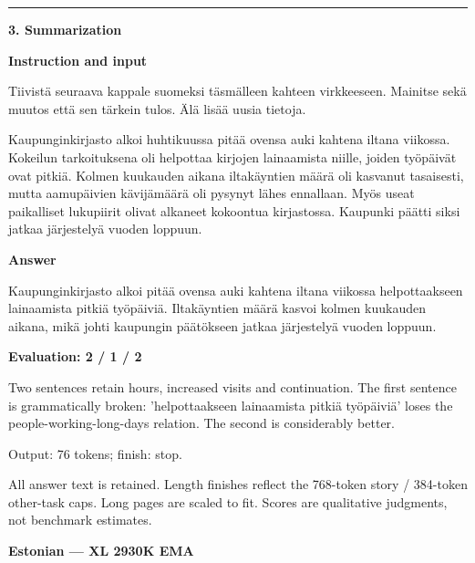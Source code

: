 \documentclass[10pt]{article}
\begin{document}
{\begin{minipage}{\textwidth}
\medskip\hrule\smallskip
{\bfseries 3. Summarization}\par\smallskip
\textbf{Instruction and input}\par Tiivistä seuraava kappale suomeksi täsmälleen kahteen virkkeeseen. Mainitse sekä muutos että sen tärkein tulos. Älä lisää uusia tietoja.
\par\smallskip
Kaupunginkirjasto alkoi huhtikuussa pitää ovensa auki kahtena iltana viikossa. Kokeilun tarkoituksena oli helpottaa kirjojen lainaamista niille, joiden työpäivät ovat pitkiä. Kolmen kuukauden aikana iltakäyntien määrä oli kasvanut tasaisesti, mutta aamupäivien kävijämäärä oli pysynyt lähes ennallaan. Myös useat paikalliset lukupiirit olivat alkaneet kokoontua kirjastossa. Kaupunki päätti siksi jatkaa järjestelyä vuoden loppuun.\par\smallskip
\textbf{Answer}\par Kaupunginkirjasto alkoi pitää ovensa auki kahtena iltana viikossa helpottaakseen lainaamista pitkiä työpäiviä. Iltakäyntien määrä kasvoi kolmen kuukauden aikana, mikä johti kaupungin päätökseen jatkaa järjestelyä vuoden loppuun.\par\smallskip
\textbf{Evaluation: 2 / 1 / 2}\par Two sentences retain hours, increased visits and continuation. The first sentence is grammatically broken: 'helpottaakseen lainaamista pitkiä työpäiviä' loses the people-working-long-days relation. The second is considerably better.
\par {\color{gray} Output: 76 tokens; finish: stop.}\par
\medskip\footnotesize All answer text is retained. Length finishes reflect the 768-token story / 384-token other-task caps. Long pages are scaled to fit. Scores are qualitative judgments, not benchmark estimates.
\end{minipage}}%
\noindent\ifdim\dimexpr\ht\languagepage+\dp\languagepage\relax>0.93\textheight%
\resizebox*{!}{0.93\textheight}{\usebox{\languagepage}}%
\else\usebox{\languagepage}\fi%
\clearpage
{\Large\bfseries Estonian --- XL 2930K EMA}\par\smallskip
\end{document}

